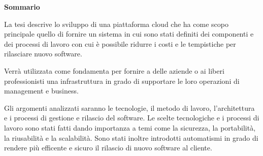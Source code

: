 \begin{center}
    \textbf{Sommario}
\end{center}
{\itshape{
    La tesi descrive lo sviluppo di una piattaforma cloud che ha come scopo principale quello di fornire un sistema in cui sono stati definiti
    dei componenti e dei processi di lavoro con cui è possibile ridurre i costi e le tempistiche per rilasciare nuovo software.

    Verrà utilizzata come fondamenta per fornire a delle aziende o ai liberi
    professionisti una infrastruttura in grado di supportare le loro operazioni di management e business.

    Gli argomenti analizzati saranno le tecnologie, il metodo di lavoro, l'architettura e i processi di gestione e rilascio del software.
    Le scelte tecnologiche e i processi di lavoro sono stati fatti dando importanza a temi come la sicurezza, la portabilità, la riusabilità e la scalabilità.
    Sono stati inoltre introdotti automatismi in grado di rendere più efficente e sicuro il rilascio di nuovo software al cliente.
}}